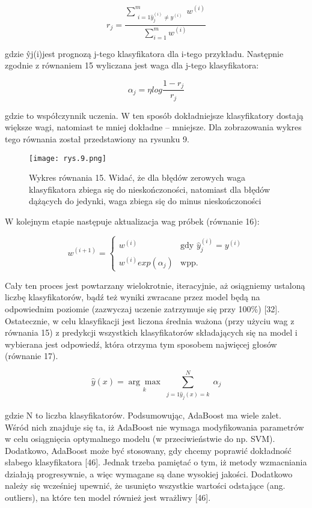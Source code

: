 \begin{equation}
r_j = \frac { \sum\limits_{\substack{i=1
\hat y_j^{(i)} \neq y^{(i)}}}^{m} w^{(i)}}{{\sum\limits_{i=1}^{m} w^{(i)}}}
\end{equation}

gdzie ŷj(i)jest prognozą j-tego klasyfikatora dla i-tego przykładu. Następnie zgodnie z  równaniem 15 wyliczana jest waga dla j-tego klasyfikatora:

\begin{equation}
\alpha_j=\eta log\frac {1-r_j} {r_j}
\end{equation}

gdzie to współczynnik uczenia. W ten sposób dokładniejsze klasyfikatory dostają 
większe wagi, natomiast te mniej dokładne – mniejsze. Dla zobrazowania wykres tego równania został przedstawiony na rysunku 9.

\begin{figure}[h]
    \centering
    \texttt{[image: rys.9.png]}
    \caption{Wykres równania 15. Widać, że dla błędów zerowych waga klasyfikatora zbiega się do nieskończoności, natomiast dla błędów dążących do jedynki, waga zbiega się do minus nieskończoności}
    \label{fig:mesh9}
\end{figure}

W kolejnym etapie następuje aktualizacja wag próbek (równanie 16):

\begin{equation}
w^{(i+1)} =
\begin{cases}
  w^{(i)} & \text{gdy } \hat {y}_j^{(i)} = y^{(i)}\\
  w^{(i)}exp(\alpha_j) & \text{wpp.}
\end{cases}
\end{equation}

Cały ten proces jest powtarzany wielokrotnie, iteracyjnie, aż osiągniemy ustaloną liczbę klasyfikatorów, bądź też wyniki zwracane przez model będą na odpowiednim
poziomie (zazwyczaj uczenie zatrzymuje się przy 100\%) [32]. Ostatecznie, w celu klasyfikacji jest liczona średnia ważona (przy użyciu wag z równania 15) z predykcji wszystkich klasyfikatorów składających się na model i wybierana jest odpowiedź, która otrzyma tym sposobem najwięcej głosów (równanie 17).

\begin{equation}
\hat y (x) = \underset{k}{\arg\max} \sum_{\substack{j=1
\hat y_j(x)=k}}^N \alpha_j
\end{equation}

gdzie N to liczba klasyfikatorów. 
    Podsumowując, AdaBoost ma wiele zalet. Wśród nich znajduje się ta, iż AdaBoost nie wymaga modyfikowania parametrów w celu osiągnięcia optymalnego modelu (w przeciwieństwie do np. SVM). Dodatkowo, AdaBoost może być stosowany, gdy chcemy poprawić dokładność słabego klasyfikatora [46]. Jednak trzeba pamiętać o tym, iż metody wzmacniania działają progresywnie, a więc wymagane są dane wysokiej jakości. Dodatkowo należy się wcześniej upewnić, że usunięto wszystkie wartości odstające (ang. outliers), na które ten model również jest wrażliwy [46]. 

